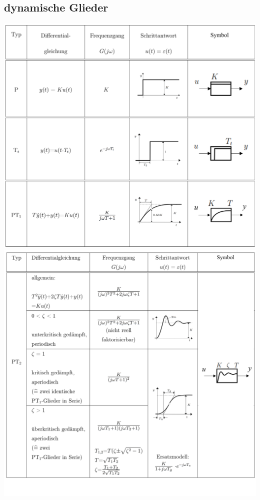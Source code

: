	
	\subsection{dynamische Glieder }
			\includegraphics[width=13.5 cm]{./bilder/grundglieder/tabelle/glieder1.png} \\
			\includegraphics[width=13.5 cm]{./bilder/grundglieder/tabelle/glieder2.png} \\
